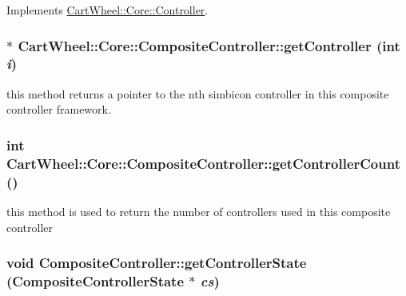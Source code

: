 Implements \hyperlink{classCartWheel_1_1Core_1_1Controller_a4355027883ca8a1be4048d95577b8e74}{CartWheel::Core::Controller}.

\hypertarget{classCartWheel_1_1Core_1_1CompositeController_a9967228d0cee474d68369866205b4cba}{
\subsubsection[{getController}]{$\ast$ CartWheel::Core::CompositeController::getController (int {\em i})}}
\label{classCartWheel_1_1Core_1_1CompositeController_a9967228d0cee474d68369866205b4cba}
this method returns a pointer to the nth simbicon controller in this composite controller framework. \hypertarget{classCartWheel_1_1Core_1_1CompositeController_a67c93f70a8ff40d41a04af02be4c5eac}{
\subsubsection[{getControllerCount}]{\setlength{\rightskip}{0pt plus 5cm}int CartWheel::Core::CompositeController::getControllerCount ()}}
\label{classCartWheel_1_1Core_1_1CompositeController_a67c93f70a8ff40d41a04af02be4c5eac}
this method is used to return the number of controllers used in this composite controller \hypertarget{classCartWheel_1_1Core_1_1CompositeController_a219265eeea3ee500a306dbd2b871f59c}{
\subsubsection[{getControllerState}]{\setlength{\rightskip}{0pt plus 5cm}void CompositeController::getControllerState ({\bf CompositeControllerState} $\ast$ {\em cs})}}
